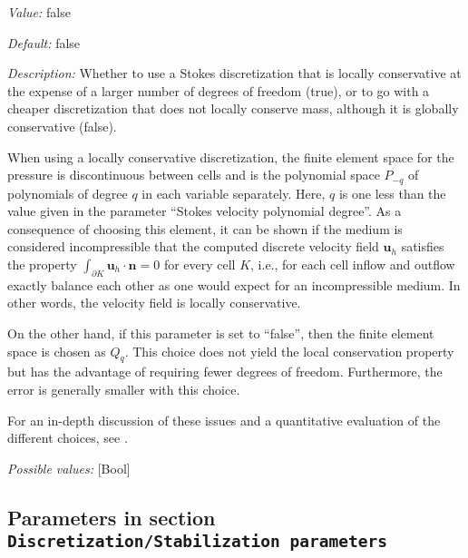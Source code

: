 \begin{itemize}
{\it Value:} false


{\it Default:} false


{\it Description:} Whether to use a Stokes discretization that is locally conservative at the expense of a larger number of degrees of freedom (true), or to go with a cheaper discretization that does not locally conserve mass, although it is globally conservative (false).

When using a locally conservative discretization, the finite element space for the pressure is discontinuous between cells and is the polynomial space $P_ {-q}$ of polynomials of degree $q$ in each variable separately. Here, $q$ is one less than the value given in the parameter ``Stokes velocity polynomial degree''. As a consequence of choosing this element, it can be shown if the medium is considered incompressible that the computed discrete velocity field $\mathbf u_h$ satisfies the property $\int_ {\partial K} \mathbf u_h \cdot \mathbf n = 0$ for every cell $K$, i.e., for each cell inflow and outflow exactly balance each other as one would expect for an incompressible medium. In other words, the velocity field is locally conservative.

On the other hand, if this parameter is set to ``false'', then the finite element space is chosen as $Q_q$. This choice does not yield the local conservation property but has the advantage of requiring fewer degrees of freedom. Furthermore, the error is generally smaller with this choice.

For an in-depth discussion of these issues and a quantitative evaluation of the different choices, see \cite {KHB12} .


{\it Possible values:} [Bool]
\end{itemize}



\subsection{Parameters in section \tt Discretization/Stabilization parameters}
\label{parameters:Discretization/Stabilization_20parameters}

